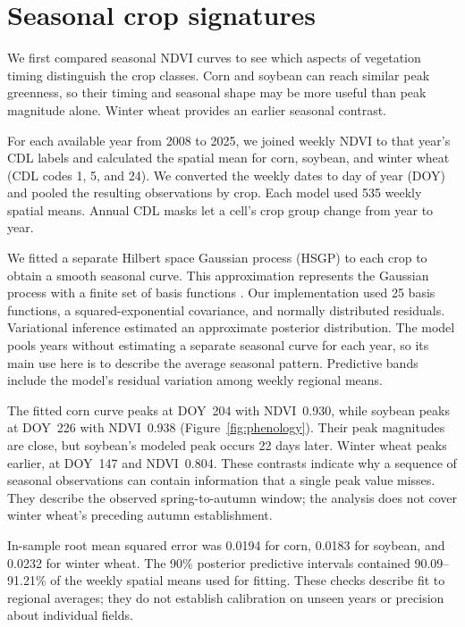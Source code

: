 \section{Seasonal crop signatures}
\label{sec:phenology}

We first compared seasonal NDVI curves to see which aspects of vegetation timing distinguish the crop classes. Corn and soybean can reach similar peak greenness, so their timing and seasonal shape may be more useful than peak magnitude alone. Winter wheat provides an earlier seasonal contrast.

For each available year from 2008 to 2025, we joined weekly NDVI to that year's CDL labels and calculated the spatial mean for corn, soybean, and winter wheat (CDL codes 1, 5, and 24). We converted the weekly dates to day of year (DOY) and pooled the resulting observations by crop. Each model used 535 weekly spatial means. Annual CDL masks let a cell's crop group change from year to year.

We fitted a separate Hilbert space Gaussian process (HSGP) to each crop to obtain a smooth seasonal curve. This approximation represents the Gaussian process with a finite set of basis functions \citep{riutort2023hsgp}. Our implementation used 25 basis functions, a squared-exponential covariance, and normally distributed residuals. Variational inference estimated an approximate posterior distribution. The model pools years without estimating a separate seasonal curve for each year, so its main use here is to describe the average seasonal pattern. Predictive bands include the model's residual variation among weekly regional means.

The fitted corn curve peaks at DOY~204 with NDVI~0.930, while soybean peaks at DOY~226 with NDVI~0.938 (Figure~\ref{fig:phenology}). Their peak magnitudes are close, but soybean's modeled peak occurs 22 days later. Winter wheat peaks earlier, at DOY~147 and NDVI~0.804. These contrasts indicate why a sequence of seasonal observations can contain information that a single peak value misses. They describe the observed spring-to-autumn window; the analysis does not cover winter wheat's preceding autumn establishment.

In-sample root mean squared error was 0.0194 for corn, 0.0183 for soybean, and 0.0232 for winter wheat. The 90\% posterior predictive intervals contained 90.09--91.21\% of the weekly spatial means used for fitting. These checks describe fit to regional averages; they do not establish calibration on unseen years or precision about individual fields.

